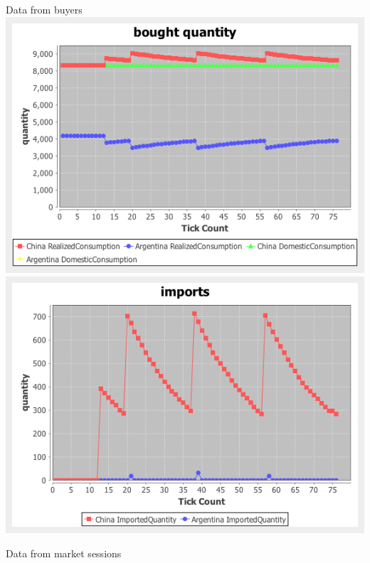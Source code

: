 \documentclass{article}
\begin{document}
\noindent Data from buyers
\vskip2mm
\hskip-2cm
\includegraphics[scale=0.4]{fig_case5_qs}
\includegraphics[scale=0.4]{fig_case5_imports}

\noindent Data from market sessions
\end{document}
